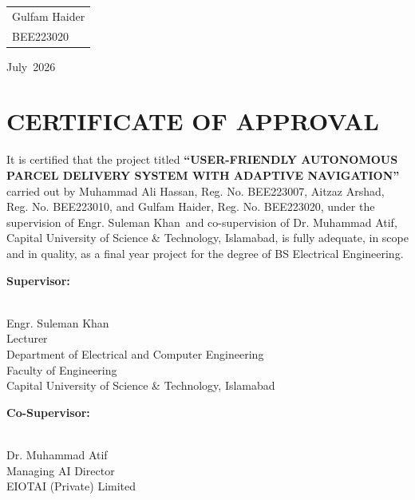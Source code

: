 \documentclass[12pt,a4paper]{report}
\newcommand{\projecttitle}{USER-FRIENDLY AUTONOMOUS PARCEL DELIVERY SYSTEM WITH ADAPTIVE NAVIGATION}
\newcommand{\studentonename}{Muhammad Ali Hassan}
\newcommand{\studentonereg}{BEE223007}
\newcommand{\studenttwoname}{Aitzaz Arshad}
\newcommand{\studenttworeg}{BEE223010}
\newcommand{\studentthreename}{Gulfam Haider}
\newcommand{\studentthreereg}{BEE223020}
\newcommand{\supervisorname}{Engr. Suleman Khan}
\newcommand{\supervisortitle}{Lecturer}
\newcommand{\cosupervisorname}{Dr. Muhammad Atif}
\newcommand{\cosupervisortitle}{Managing AI Director}
\newcommand{\submissionmonth}{July}
\newcommand{\submissionyear}{2026}
\begin{document}
	\vspace{1cm}
	
	\noindent
	\begin{tabular}{@{}l@{}}
		\studentthreename \\
		\studentthreereg
	\end{tabular}
	
	\vspace{2cm}
	
	\noindent
	\submissionmonth\ \submissionyear
	\clearpage
	
	\chapter*{CERTIFICATE OF APPROVAL}
	\thispagestyle{plain}
	
	It is certified that the project titled \textbf{``\projecttitle''} carried out by \studentonename, Reg. No. \studentonereg, \studenttwoname, Reg. No. \studenttworeg, and \studentthreename, Reg. No. \studentthreereg, under the supervision of \supervisorname\ and co-supervision of \cosupervisorname, Capital University of Science \& Technology, Islamabad, is fully adequate, in scope and in quality, as a final year project for the degree of BS Electrical Engineering.
	
	\vspace{1.5cm}
	
	\noindent\textbf{Supervisor:}
	\begin{center}
		\makebox[7cm]{\dotfill} \\
		\supervisorname \\
		\supervisortitle \\
		Department of Electrical and Computer Engineering \\
		Faculty of Engineering \\
		Capital University of Science \& Technology, Islamabad
	\end{center}
	
	\vspace{1cm}
	
	\noindent\textbf{Co-Supervisor:}
	\begin{center}
		\makebox[7cm]{\dotfill} \\
		\cosupervisorname \\
		\cosupervisortitle \\
		EIOTAI (Private) Limited
	\end{center}
	
	\vspace{1cm}
	
\end{document}
